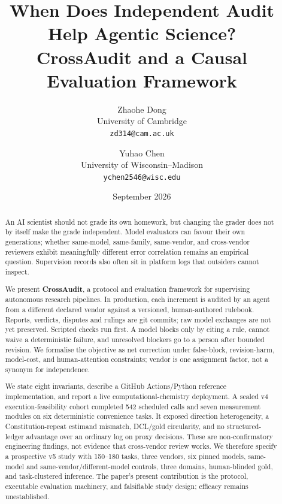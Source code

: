 \documentclass[11pt]{article}
\title{\textbf{When Does Independent Audit Help Agentic Science?\\CrossAudit and a Causal Evaluation Framework}}
\author{Zhaohe Dong\\
\normalsize University of Cambridge\\
\normalsize \texttt{zd314@cam.ac.uk}
\and Yuhao Chen\\
\normalsize University of Wisconsin--Madison\\
\normalsize \texttt{ychen2546@wisc.edu}}
\date{September 2026}
\begin{document}
\maketitle

\begin{abstract}
\noindent An AI scientist should not grade its own homework, but changing the grader does not by itself make the grade independent. Model evaluators can favour their own generations; whether same-model, same-family, same-vendor, and cross-vendor reviewers exhibit meaningfully different error correlation remains an empirical question. Supervision records also often sit in platform logs that outsiders cannot inspect.

We present \textbf{CrossAudit}, a protocol and evaluation framework for supervising autonomous research pipelines. In production, each increment is audited by an agent from a different declared vendor against a versioned, human-authored rulebook. Reports, verdicts, disputes and rulings are git commits; raw model exchanges are not yet preserved. Scripted checks run first. A model blocks only by citing a rule, cannot waive a deterministic failure, and unresolved blockers go to a person after bounded revision. We formalise the objective as net correction under false-block, revision-harm, model-cost, and human-attention constraints; vendor is one assignment factor, not a synonym for independence.

We state eight invariants, describe a GitHub Actions/Python reference implementation, and report a live computational-chemistry deployment. A sealed v4 execution-feasibility cohort completed 542 scheduled calls and seven measurement modules on six deterministic convenience tasks. It exposed direction heterogeneity, a Constitution-repeat estimand mismatch, DCL/gold circularity, and no structured-ledger advantage over an ordinary log on proxy decisions. These are non-confirmatory engineering findings, not evidence that cross-vendor review works. We therefore specify a prospective v5 study with 150--180 tasks, three vendors, six pinned models, same-model and same-vendor/different-model controls, three domains, human-blinded gold, and task-clustered inference. The paper's present contribution is the protocol, executable evaluation machinery, and falsifiable study design; efficacy remains unestablished.
\end{abstract}

\vspace{5pt}
\end{document}
